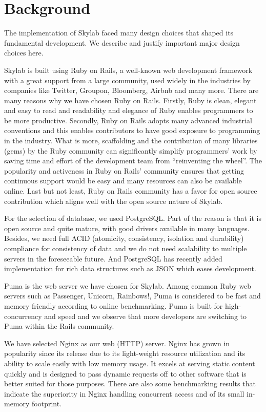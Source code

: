 \chapter{Background} \label{background}

The implementation of Skylab faced many design choices that shaped its fundamental development.  We describe and justify important major design choices here.

Skylab is built using Ruby on Rails, a well-known web development framework with a great support from a large community, used widely in the industries by companies like Twitter, Groupon, Bloomberg, Airbnb and many more\cite{citation1}. There are many reasons why we have chosen Ruby on Rails. Firstly, Ruby is clean, elegant and easy to read and readability and elegance of Ruby enables programmers to be more productive. Secondly, Ruby on Rails adopts many advanced industrial conventions and this enables contributors to have good exposure to programming in the industry. What is more, scaffolding and the contribution of many libraries (gems) by the Ruby community can significantly simplify programmers' work by saving time and effort of the development team from ``reinventing the wheel''.  The popularity and activeness in Ruby on Rails' community ensures that getting continuous support would be easy and many resources can also be available online. Last but not least, Ruby on Rails community has a favor for open source contribution which aligns well with the open source nature of Skylab.

For the selection of database, we used PostgreSQL. Part of the reason is that it is open source and quite mature, with good drivers available in many languages\cite{citation2}. Besides, we need full ACID (atomicity, consistency, isolation and durability) compliance for consistency of data and we do not need scalability to multiple servers in the foreseeable future\cite{citationACID}. And PostgreSQL has recently added implementation for rich data structures such as JSON which eases development\cite{citation3}.

Puma is the web server we have chosen for Skylab. Among common Ruby web servers such as Passenger, Unicorn, Rainbows!, Puma is considered to be fast and memory friendly according to online benchmarking\cite{citation4}. Puma is built for high-concurrency and speed and we observe that more developers are switching to Puma within the Rails community\cite{citation5}.

We have selected Nginx as our web (HTTP) server. Nginx has grown in popularity since its release due to its light-weight resource utilization and its ability to scale easily with low memory usage. It excels at serving static content quickly and is designed to pass dynamic requests off to other software that is better suited for those purposes\cite{citation6}. There are also some benchmarking results that indicate the superiority in Nginx handling concurrent access and of its small in-memory footprint\cite{citation7}.

